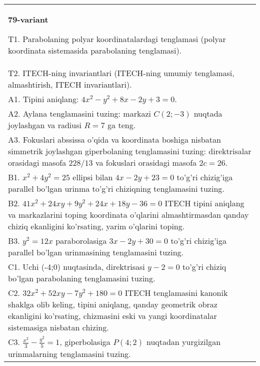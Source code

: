 \documentclass{article}
\begin{document}
\begin{tabular}{m{17cm}}
\textbf{79-variant}
\newline

T1. Parabolaning polyar koordinatalardagi tenglamasi (polyar koordinata sistemasida parabolaning tenglamasi).\\

T2. ITECH-ning invariantlari (ITECH-ning umumiy tenglamasi, almashtirish, ITECH invariantlari).\\

A1. Tipini aniqlang: $4x^{2}-y^{2}+8x-2y+3=0$.\\

A2. Aylana tenglamasini tuzing: markazi $C(2;-3)$ nuqtada joylashgan va radiusi $R=7$ ga teng.\\

A3. Fokuslari abssissa o'qida va koordinata boshiga nisbatan simmetrik joylashgan giperbolaning tenglamasini tuzing: direktrisalar orasidagi masofa $228/13$ va fokuslari orasidagi masofa $2c=26$.\\

B1. $x^{2} + 4y^{2} = 25$ ellipsi bilan $4x - 2y + 23 = 0$ to'g'ri chizig'iga parallel bo'lgan urinma to'g'ri chiziqning tenglamasini tuzing.  \\

B2. $41x^{2} + 24xy + 9y^{2} + 24x + 18y - 36 = 0$ ITECH tipini aniqlang va markazlarini toping koordinata o'qlarini almashtirmasdan qanday chiziq ekanligini ko'rsating, yarim o'qlarini toping.  \\

B3. $y^{2} = 12x$ paraborolasiga $3x - 2y + 30 = 0$ to'g'ri chizig'iga parallel bo'lgan urinmasining tenglamasini tuzing.  \\

C1. Uchi (-4;0) nuqtasinda, direktrisasi $y - 2 = 0$ to'g'ri chiziq bo'lgan parabolaning tenglamasini tuzing.\\

C2. $32x^{2} + 52xy - 7y^{2} + 180 = 0$ ITECH tenglamasini kanonik shaklga olib keling, tipini aniqlang, qanday geometrik obraz ekanligini ko'rsating, chizmasini eski va yangi koordinatalar sistemasiga nisbatan chizing.  \\

C3. $\frac{x^{2}}{3} - \frac{y^{2}}{5} = 1$, giperbolasiga $P(4;2)$ nuqtadan yurgizilgan urinmalarning tenglamasini tuzing.  \\

\end{tabular}
\vspace{1cm}
\end{document}
